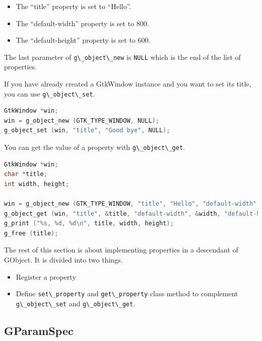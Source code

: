 \begin{itemize}
\tightlist
\item
  The ``title'' property is set to ``Hello''.
\item
  The ``default-width'' property is set to 800.
\item
  The ``default-height'' property is set to 600.
\end{itemize}

The last parameter of \passthrough{\lstinline!g\_object\_new!} is
\passthrough{\lstinline!NULL!} which is the end of the list of
properties.

If you have already created a GtkWindow instance and you want to set its
title, you can use \passthrough{\lstinline!g\_object\_set!}.

\begin{lstlisting}[language=C]
GtkWindow *win;
win = g_object_new (GTK_TYPE_WINDOW, NULL);
g_object_set (win, "title", "Good bye", NULL);
\end{lstlisting}

You can get the value of a property with
\passthrough{\lstinline!g\_object\_get!}.

\begin{lstlisting}[language=C]
GtkWindow *win;
char *title;
int width, height;

win = g_object_new (GTK_TYPE_WINDOW, "title", "Hello", "default-width", 800, "default-height", 600, NULL);
g_object_get (win, "title", &title, "default-width", &width, "default-height", &height, NULL);
g_print ("%s, %d, %d\n", title, width, height);
g_free (title);
\end{lstlisting}

The rest of this section is about implementing properties in a
descendant of GObject. It is divided into two things.

\begin{itemize}
\tightlist
\item
  Register a property
\item
  Define \passthrough{\lstinline!set\_property!} and
  \passthrough{\lstinline!get\_property!} class method to complement
  \passthrough{\lstinline!g\_object\_set!} and
  \passthrough{\lstinline!g\_object\_get!}.
\end{itemize}

\subsection{GParamSpec}\label{gparamspec}

